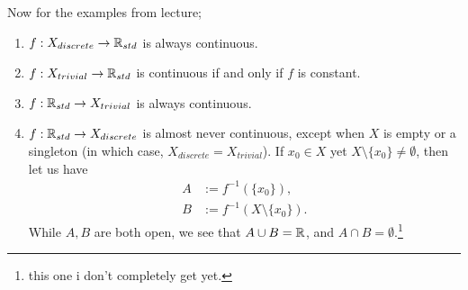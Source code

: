 \noindent Now for the examples from lecture;
\begin{enumerate}[label=(\alph*)]
    \item $f : X_{discrete} \to \mathbb R_{std}$ is always continuous.
    \item $f : X_{trivial} \to \mathbb R_{std}$ is continuous if and only if $f$ is constant.
    \item $f : \mathbb R_{std} \to X_{trivial}$ is always continuous.
    \item $f : \mathbb R_{std} \to X_{discrete}$ is almost never continuous, except when $X$ is empty or a singleton (in which case, $X_{discrete} = X_{trivial}$). If $x_0 \in X$ yet $X \setminus \{x_0\} \neq \emptyset$, then let us have
    \begin{align*}
        A &:= f^{-1}(\{x_0\}), \\
        B &:= f^{-1}(X \setminus \{x_0\}).
    \end{align*} 
    While $A, B$ are both open, we see that $A \cup B = \mathbb R$, and $A \cap B = \emptyset$.\footnote{this one i don't completely get yet.}
\end{enumerate}
